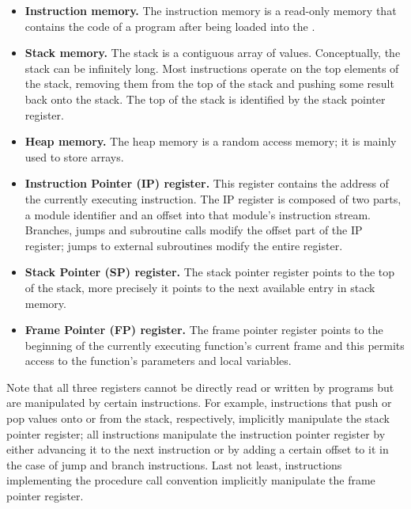 \begin{itemize}
    \item \textbf{Instruction memory.} The instruction memory is a read-only memory that contains the code of a program after being loaded into the \civicvm{}.
    
    \item \textbf{Stack memory.} The stack is a contiguous array of values. Conceptually, the stack can be infinitely long. Most instructions operate on the top elements of the stack, removing them from the top of the stack and pushing some result back onto the stack. The top of the stack is identified by the stack pointer register.
    
    \item \textbf{Heap memory.} The heap memory is a random access memory; it is mainly used to store arrays.
    
    \item \textbf{Instruction Pointer (IP) register.} This register contains the address of the currently executing instruction. The IP register is composed of two parts, a module identifier and an offset into that module's instruction stream. Branches, jumps and subroutine calls modify the offset part of the IP register; jumps to external subroutines modify the entire register.
    
    \item \textbf{Stack Pointer (SP) register.} The stack pointer register points to the top of the stack, more precisely it points to the next available entry in stack memory.
    
    \item \textbf{Frame Pointer (FP) register.} The frame pointer register points to the beginning of the currently executing function's current frame and this permits access to the function's parameters and local variables.
\end{itemize}

Note that all three registers cannot be directly read or written by programs but are manipulated by certain instructions. For example, instructions that push or pop values onto or from the stack, respectively, implicitly manipulate the stack pointer register; all instructions manipulate the instruction pointer register by either advancing it to the next instruction or by adding a certain offset to it in the case of jump and branch instructions. Last not least, instructions implementing the procedure call convention implicitly manipulate the frame pointer register.

